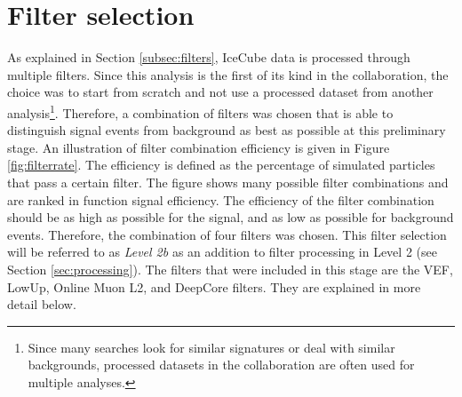 \section{Filter selection}
\label{sec:filterselection}
As explained in Section \ref{subsec:filters}, IceCube data is processed through multiple filters. Since this analysis is the first of its kind in the collaboration, the choice was to start from scratch and not use a processed dataset from another analysis\footnote{Since many searches look for similar signatures or deal with similar backgrounds, processed datasets in the collaboration are often used for multiple analyses.}. Therefore, a combination of filters was chosen that is able to distinguish signal events from background as best as possible at this preliminary stage. An illustration of filter combination efficiency is given in Figure \ref{fig:filterrate}. The efficiency is defined as the percentage of simulated particles that pass a certain filter. The figure shows many possible filter combinations and are ranked in function signal efficiency. The efficiency of the filter combination should be as high as possible for the signal, and as low as possible for background events. Therefore, the combination of four filters was chosen. This filter selection will be referred to as \textit{Level 2b} as an addition to filter processing in Level 2 (see Section \ref{sec:processing}). The filters that were included in this stage are the VEF, LowUp, Online Muon L2, and DeepCore filters. They are explained in more detail below. 

